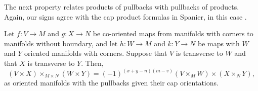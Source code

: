 The next property relates products of pullbacks with pullbacks of products. Again, our signs agree with the cap product formulas in Spanier, in this case \cite[Section 5.6.21]{Span81}.

\begin{proposition}\label{P: cap cross}
	Let $f \colon V \to M$ and $g:X \to N$ be co-oriented maps from manifolds with corners to manifolds without boundary, and let $h \colon W \to M$ and $k \colon Y \to N$ be maps with $W$ and $Y$ oriented manifolds with corners.
	Suppose that $V$ is transverse to $W$ and that $X$ is transverse to $Y$.
	Then,
	$$(V \times X)\times_{M \times N} (W \times Y) = (-1)^{(x+y-n)(m-v)} (V \times_M W) \times (X \times_N Y),$$
	as oriented manifolds with the pullbacks given their cap orientations.
\end{proposition}

